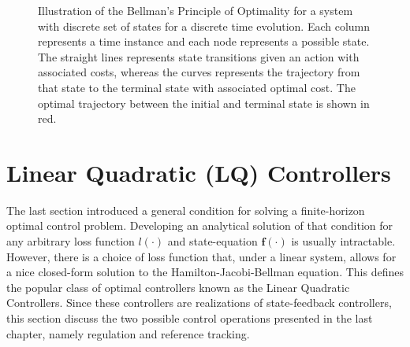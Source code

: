 \documentclass[a4paper,11pt]{book}
\numberwithin{figure}{chapter}
\numberwithin{equation}{chapter}
\numberwithin{table}{chapter}
\theoremstyle{definition}
\begin{document}
\begin{figure}[ht]
    \centering
    \caption{Illustration of the Bellman's Principle of Optimality for a system with discrete set of states for a discrete time evolution. Each column represents a time instance and each node represents a possible state. The straight lines represents state transitions given an action with associated costs, whereas the curves represents the trajectory from that state to the terminal state with associated optimal cost. The optimal trajectory between the initial and terminal state is shown in red.}
    \label{fig:generalOC01}
\end{figure}

\section{Linear Quadratic (LQ) Controllers}

The last section introduced a general condition for solving a finite-horizon optimal control problem. Developing an analytical solution of that condition for any arbitrary loss function $l(\cdot)$ and state-equation $\bm{f}(\cdot)$ is usually intractable. However, there is a choice of loss function that, under a linear system, allows for a nice closed-form solution to the Hamilton-Jacobi-Bellman equation. This defines the popular class of optimal controllers known as the Linear Quadratic Controllers. Since these controllers are realizations of state-feedback controllers, this section discuss the two possible control operations presented in the last chapter, namely regulation and reference tracking. 
\end{document}
